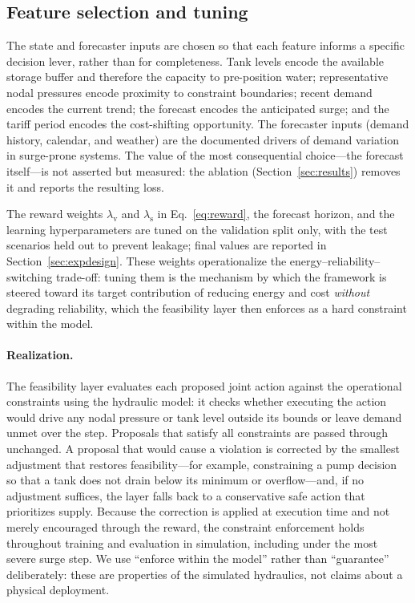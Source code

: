 \documentclass[11pt,a4paper]{article}
\begin{document}
\subsection{Feature selection and tuning}
\label{sec:features}
The state and forecaster inputs are chosen so that each feature informs a specific
decision lever, rather than for completeness. Tank levels encode the available
storage buffer and therefore the capacity to pre-position water; representative
nodal pressures encode proximity to constraint boundaries; recent demand encodes
the current trend; the forecast encodes the anticipated surge; and the tariff
period encodes the cost-shifting opportunity. The forecaster inputs (demand
history, calendar, and weather) are the documented drivers of demand variation in
surge-prone systems. The value of the most consequential choice---the forecast
itself---is not asserted but measured: the ablation (Section~\ref{sec:results})
removes it and reports the resulting loss.

The reward weights $\lambda_{\mathrm{v}}$ and $\lambda_{\mathrm{s}}$ in
Eq.~\eqref{eq:reward}, the forecast horizon, and the learning hyperparameters are
tuned on the validation split only, with the test scenarios held out to prevent
leakage; final values are reported in Section~\ref{sec:expdesign}. These weights
operationalize the energy--reliability--switching trade-off: tuning them is the
mechanism by which the framework is steered toward its target contribution of
reducing energy and cost \emph{without} degrading reliability, which the
feasibility layer then enforces as a hard constraint within the model.

\paragraph{Realization.} The feasibility layer evaluates each proposed joint
action against the operational constraints using the hydraulic model: it checks
whether executing the action would drive any nodal pressure or tank level outside
its bounds or leave demand unmet over the step. Proposals that satisfy all
constraints are passed through unchanged. A proposal that would cause a violation
is corrected by the smallest adjustment that restores feasibility---for example,
constraining a pump decision so that a tank does not drain below its minimum or
overflow---and, if no adjustment suffices, the layer falls back to a conservative
safe action that prioritizes supply. Because the correction is applied at
execution time and not merely encouraged through the reward, the constraint
enforcement holds throughout training and evaluation in simulation,
including under the most severe surge step. We use ``enforce within the model''
rather than ``guarantee'' deliberately: these are properties of the simulated
hydraulics, not claims about a physical deployment.
\end{document}
